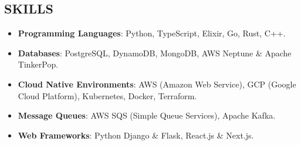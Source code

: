 \subsection*{SKILLS}

\begin{itemize}[leftmargin=*,labelsep=1mm]
  \setlength{\parskip}{0mm}
  \setlength{\itemsep}{1mm}
  \item \textbf{Programming Languages}: Python, TypeScript, Elixir, Go, Rust, C++.
  \item \textbf{Databases}: PostgreSQL, DynamoDB, MongoDB, AWS Neptune \& Apache TinkerPop.
  \item \textbf{Cloud Native Environments}: AWS (Amazon Web Service), GCP (Google Cloud Platform),
    Kubernetes, Docker, Terraform.
  \item \textbf{Message Queues}: AWS SQS (Simple Queue Services), Apache Kafka.
  \item \textbf{Web Frameworks}: Python Django \& Flask, React.js \& Next.js.
\end{itemize}
